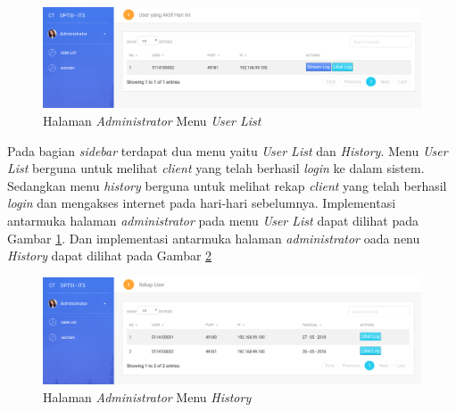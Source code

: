 \begin{figure}[H]
	\centering
	\includegraphics[width=\linewidth]{images/bab4/useraktif}
	\caption{Halaman \textit{Administrator} Menu \textit{User List}}
	\label{halamandashboardadmin}
\end{figure}

Pada bagian \textit{sidebar} terdapat dua menu yaitu \textit{User List} dan \textit{History}. Menu \textit{User List} berguna untuk melihat \textit{client} yang telah berhasil \textit{login} ke dalam sistem. Sedangkan menu \textit{history} berguna untuk melihat rekap \textit{client} yang telah berhasil \textit{login} dan mengakses internet pada hari-hari sebelumnya. Implementasi antarmuka halaman \textit{administrator} pada menu \textit{User List} dapat dilihat pada Gambar \ref{halamandashboardadmin}. Dan implementasi antarmuka halaman \textit{administrator} oada nenu \textit{History} dapat dilihat pada Gambar \ref{userrekap}
\newline
\newline
\newline

\begin{figure}[H]
	\centering
	\includegraphics[width=\linewidth]{images/bab4/userrekap}
	\caption{Halaman \textit{Administrator} Menu \textit{History}}
	\label{userrekap}
\end{figure}